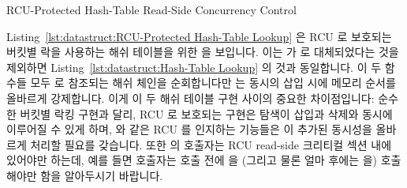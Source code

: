 \begin{listing}[tb]

\caption{RCU-Protected Hash-Table Read-Side Concurrency Control}
\label{lst:datastruct:RCU-Protected Hash-Table Read-Side Concurrency Control}
\end{listing}

Listing~\ref{lst:datastruct:RCU-Protected Hash-Table Lookup}
은 RCU 로 보호되는 버킷별 락을 사용하는 해쉬 테이블을 위한
 을 보입니다.
이는  가  로
대체되었다는 것을 제외하면
Listing~\ref{lst:datastruct:Hash-Table Lookup} 의 것과 동일합니다.
이 두 함수들 모두  로 참조되는 해쉬 체인을 순회합니다만
 는 동시의 삽입 시에 메모리 순서를 올바르게
강제합니다.
이게 이 두 해쉬 테이블 구현 사이의 중요한 차이점입니다:
순수한 버킷별 락킹 구현과 달리, RCU 로 보호되는 구현은 탐색이 삽입과 삭제와
동시에 이루어질 수 있게 하며,  와 같은 RCU 를
인지하는 기능들은 이 추가된 동시성을 올바르게 처리할 필요를 갖습니다.
또한  의 호출자는 RCU read-side 크리티컬 섹션 내에
있어야만 하는데, 예를 들면 호출자는  호출 전에
 을 (그리고 물론 얼마 후에는
 을) 호출해야만 함을 알아두시기 바랍니다.

\iffalse


